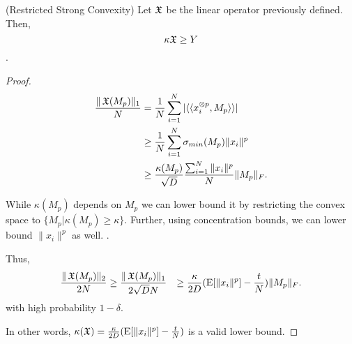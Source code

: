 \begin{lemma}(Restricted Strong Convexity)
  Let $\operatorname{\mathfrak{X}}$ be the linear operator previously defined. Then,
  $$\kappa{\operatorname{\mathfrak{X}}} \ge Y$$.
\end{lemma}
\begin{proof}

  \begin{align*}
    \frac{\|\operatorname{\mathfrak{X}}(M_p)\|_1}{N} &= \frac{1}{N}\sum_{i=1}^{N} |\langle\langle x_i^{\otimes p}, M_p \rangle\rangle| \\
    &\ge \frac{1}{N}\sum_{i=1}^{N} \sigma_{min}( M_p ) \|x_i\|^p \\
    &\ge \frac{\kappa(M_p)}{\sqrt{D}} \frac{\sum_{i=1}^{N} \|x_i\|^p}{N} \| M_p \|_F.
  \end{align*}

  While $\kappa(M_p)$ depends on $M_p$ we can lower bound it by
  restricting the convex space to $\{ M_p | \kappa(M_p) \ge \kappa \}$.
  Further, using concentration bounds, we can lower bound $\|x_i\|^p$ as
  well. .
  
  Thus, 
  \begin{align*}
  \frac{ \|\operatorname{\mathfrak{X}}(M_p)\|_2 }{2 N} 
  &\ge
  \frac{ \|\operatorname{\mathfrak{X}}(M_p)\|_1 }{2 \sqrt{D}N} 
  &\ge \frac{\kappa}{2 D} (\operatorname{E}[\|x_i\|^p] - \frac{t}{N}) \| M_p \|_F.
  \end{align*}
  with high probability $1 - \delta$. 
  
  In other words, $\kappa(\operatorname{\mathfrak{X}})
  = \frac{\kappa}{2 D} (\operatorname{E}[\|x_i\|^p] - \frac{t}{N})$ is a valid
  lower bound.
\end{proof}

